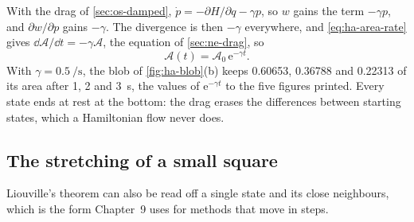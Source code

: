 With the drag of \cref{sec:os-damped}, $\dot{p} = -\partial H/\partial q -
\gamma p$, so $w$ gains the term $-\gamma p$, and $\partial w/\partial p$
gains $-\gamma$. The divergence is then $-\gamma$ everywhere, and
\cref{eq:ha-area-rate} gives $\dd\mathcal{A}/\dd t = -\gamma\mathcal{A}$,
the equation of \cref{sec:ne-drag}, so
\begin{equation*}
   \mathcal{A}(t) = \mathcal{A}_0\,\mathrm{e}^{-\gamma t} .
\end{equation*}
With $\gamma = \SI{0.5}{\per\second}$, the blob of \cref{fig:ha-blob}(b)
keeps 0.60653, 0.36788 and 0.22313 of its area after 1, 2 and
\SI{3}{\second}, the values of $\mathrm{e}^{-\gamma t}$ to the five
figures printed. Every state ends at rest at the bottom: the drag erases
the differences between starting states, which a Hamiltonian flow never
does.

\subsection*{The stretching of a small square}

Liouville's theorem can also be read off a single state and its close
neighbours, which is the form Chapter~9 uses for methods that move in
steps.

